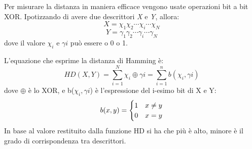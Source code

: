 \noindent Per misurare la distanza in maniera efficace vengono usate operazioni bit a bit XOR.
Ipotizzando di avere due descrittori \textit{X} e \textit{Y}, allora:
\begin{equation}
	X = \chi_{1}\chi_{2}\cdots\chi_{i}\cdots\chi_{N}
\end{equation}
\begin{equation}
    Y = \gamma_{1}\gamma_{2}\cdots\gamma_{i}\cdots\gamma_{N}
\end{equation}
\noindent dove il valore \(\chi_{i}\) e \(\gamma{i}\) può essere o 0 o 1. \par
\noindent L'equazione che esprime la distanza di Hamming è:
\begin{equation}
	HD(X, Y) = \sum_{i=1}^{N} \chi_{i} \oplus \gamma{i} = \sum_{i=1}^{n} b(\chi_{i}, \gamma{i})
\end{equation}
\noindent dove \(\oplus\) è lo XOR, e b(\(\chi_{i}, \gamma{i}\)) è l'espressione del i-esimo bit di X e Y:
\begin{equation}
	b(x, y) = \begin{cases}
      1 & \text{\( x \neq y \)} \\
      0 & \text{\( x = y \)}
    \end{cases}  
\end{equation}
\noindent In base al valore restituito dalla funzione HD si ha che più è alto, minore è il grado di corrispondenza tra descrittori.
